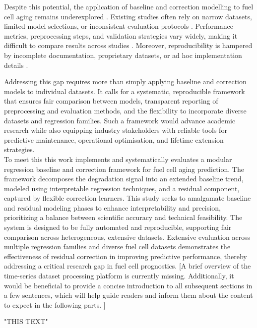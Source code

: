 Despite this potential, the application of baseline and correction modelling to fuel cell aging remains underexplored \cite{Humphreys2020Prognostics,Shah2021IJHE,Song2019Review}. Existing studies often rely on narrow datasets, limited model selections, or inconsistent evaluation protocols \cite{Humphreys2020Prognostics,Attia2020BatteryScience}. Performance metrics, preprocessing steps, and validation strategies vary widely, making it difficult to compare results across studies \cite{Karpatne2019TGDS,Willard2022NRP}. Moreover, reproducibility is hampered by incomplete documentation, proprietary datasets, or ad hoc implementation details \cite{Raissi2019PINN,IEA2022GlobalHydrogen}.  

Addressing this gap requires more than simply applying baseline and correction models to individual datasets. It calls for a systematic, reproducible framework that ensures fair comparison between models, transparent reporting of preprocessing and evaluation methods, and the flexibility to incorporate diverse datasets and regression families\cite{Willard2022NRP,Karpatne2019TGDS,Severson2019BatteryPrognostics}. Such a framework would advance academic research while also equipping industry stakeholders with reliable tools for predictive maintenance, operational optimisation, and lifetime extension strategies\cite{Rasouli2022DigitalTwin,Nguyen2021EnergiesPEMFCdurability,HydrogenCouncil2020Report}.
\noindent\\
To meet this this work implements and systematically evaluates a modular regression baseline and correction framework for fuel cell aging prediction. The framework decomposes the degradation signal into an extended baseline trend, modeled using interpretable regression techniques, and a residual component, captured by flexible correction learners. This study seeks to amalgamate baseline and residual modeling phases to enhance interpretability and precision, prioritizing a balance between scientific accuracy and technical feasibility. The system is designed to be fully automated and reproducible, supporting fair comparison across heterogeneous, extensive datasets. Extensive evaluation across multiple regression families and diverse fuel cell datasets demonstrates the effectiveness of residual correction in improving predictive performance, thereby addressing a critical research gap in fuel cell prognostics. [A brief overview of the time-series dataset processing platform is currently missing. Additionally, it would be beneficial to provide a concise introduction to all subsequent sections in a few sentences, which will help guide readers and inform them about the content to expect in the following parts.
]


"THIS TEXT"


